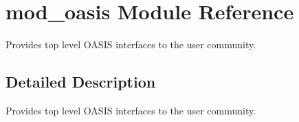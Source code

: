 \hypertarget{namespacemod__oasis}{}\section{mod\+\_\+oasis Module Reference}
\label{namespacemod__oasis}


Provides top level O\+A\+S\+IS interfaces to the user community.  




\subsection{Detailed Description}
Provides top level O\+A\+S\+IS interfaces to the user community. 